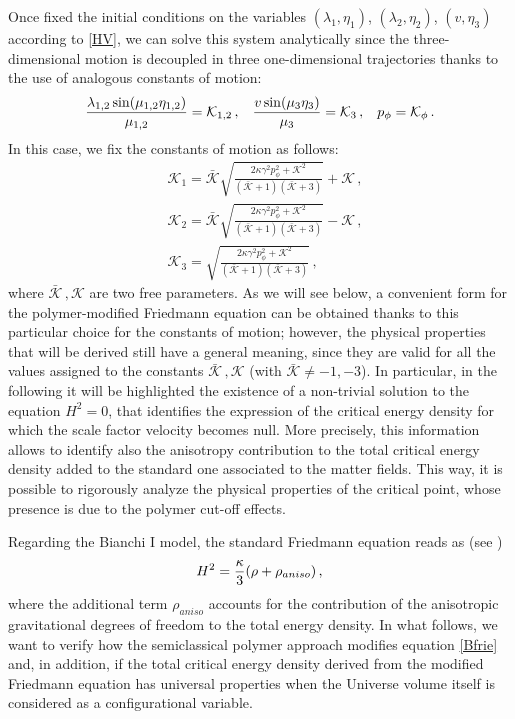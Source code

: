 \documentclass[aps,prd,twocolumn,nofootinbib,superscriptaddress]{revtex4-2}
\begin{document}
Once fixed the initial conditions on the variables $(\lambda_1,\eta_1)$, $(\lambda_2,\eta_2)$, $(v,\eta_3)$ according to \eqref{HV}, we can solve this system analytically since the three-dimensional motion is decoupled in three one-dimensional trajectories thanks to the use of analogous constants of motion:
\begin{equation}
	{\lambda_{1,2}\sin(\mu_{1,2}\eta_{1,2})\over{\mu_{1,2}}}=\mathcal{K}_{1,2}\,,\hspace{0.3cm}{v\sin(\mu_3\eta_3)\over{\mu_3}}=\mathcal{K}_{3}\,,\hspace{0.3cm}p_{\phi}=\mathcal{K}_{\phi}\,.
\end{equation}		
In this case, we fix the constants of motion as follows:
\begin{equation}
	\begin{aligned}
		\label{cond}
		&\mathcal{K}_1=\bar{\mathcal{K}}\sqrt{\frac{2\kappa\gamma^2p_\phi^2+\mathcal{K}^2}{(\bar{\mathcal{K}}+1)(\bar{\mathcal{K}}+3)}}+\mathcal{K}\,,\\
		&\mathcal{K}_2=\bar{\mathcal{K}}\sqrt{\frac{2\kappa\gamma^2p_\phi^2+\mathcal{K}^2}{(\bar{\mathcal{K}}+1)(\bar{\mathcal{K}}+3)}}-\mathcal{K}\,,\\
		&\mathcal{K}_3=\sqrt{\frac{2\kappa\gamma^2p_\phi^2+\mathcal{K}^2}{(\bar{\mathcal{K}}+1)(\bar{\mathcal{K}}+3)}}\,,
	\end{aligned}
\end{equation}
where $\bar{\mathcal{K}}\,,\mathcal{K}$ are two free parameters. As we will see below, a convenient form for the polymer-modified Friedmann equation can be obtained thanks to this particular choice for the constants of motion; however, the physical properties that will be derived still have a general meaning, since they are valid for all the values assigned to the constants $\bar{\mathcal{K}}\,,\mathcal{K}$ (with $\bar{\mathcal{K}}\neq-1,-3$). In particular, in the following it will be highlighted the existence of a non-trivial solution to the equation $H^2=0$, that identifies the expression of the critical energy density for which the scale factor velocity becomes null. More precisely, this information allows to identify also the anisotropy contribution to the total critical energy density added to the standard one associated to the matter fields. This way, it is possible to rigorously analyze the physical properties of the critical point, whose presence is due to the polymer cut-off effects.

Regarding the Bianchi I model, the standard Friedmann equation reads as (see \cite{G})
\begin{equation}
	H^{2}={\kappa\over 3}(\rho+\rho_{aniso})\,,
	\label{Bfrie}
\end{equation}  
where the additional term $\rho_{aniso}$ accounts for the contribution of the anisotropic gravitational degrees of freedom to the total energy density. In what follows, we want to verify how the semiclassical polymer approach modifies equation \eqref{Bfrie} and, in addition, if the total critical energy density derived from the modified Friedmann equation has universal properties when the Universe volume itself is considered as a configurational variable.
\end{document}
